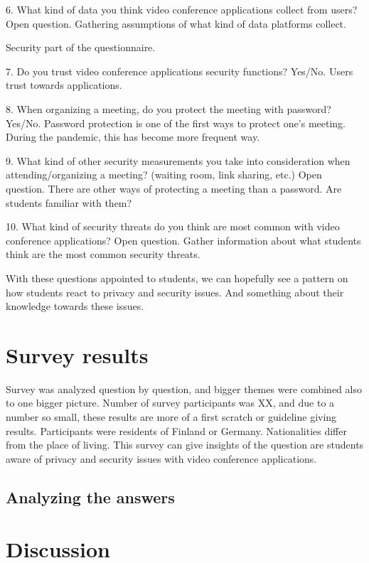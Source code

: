 \documentclass[utf8,english]{gradu3}
\begin{document}
6. What kind of data you think video conference applications collect from users? Open question. Gathering assumptions of what kind of data platforms collect.

Security part of the questionnaire.

7. Do you trust video conference applications security functions? Yes/No. Users trust towards applications.

8. When organizing a meeting, do you protect the meeting with password? Yes/No. Password protection is one of the first ways to protect one's meeting. During the pandemic, this has become more frequent way.

9. What kind of other security measurements you take into consideration when attending/organizing a meeting? (waiting room, link sharing, etc.) Open question. There are other ways of protecting a meeting than a password. Are students familiar with them?

10. What kind of security threats do you think are most common with video conference applications? Open question. Gather information about what students think are the most common security threats.

With these questions appointed to students, we can hopefully see a pattern on how students react to privacy and security issues. And something about their knowledge towards these issues. 

\chapter{Survey results}
\label{surveyresults}
Survey was analyzed question by question, and bigger themes were combined also to one bigger picture. Number of survey participants was XX, and due to a number so small, these results are more of a first scratch or guideline giving results. Participants were residents of Finland or Germany. Nationalities differ from the place of living. This survey can give insights of the question are students aware of privacy and security issues with video conference applications.

\section{Analyzing the answers}


\chapter{Discussion}
\label{discussion}
\end{document}
